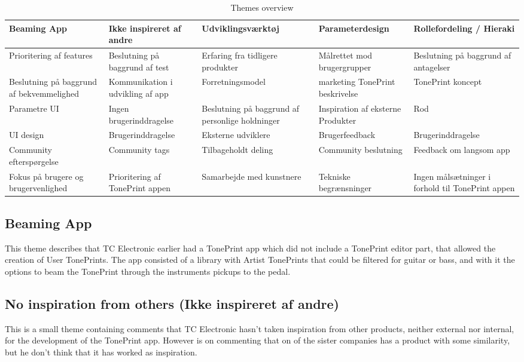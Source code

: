 \begin{table}[H]
\label{ThemesOverview}
\small
\begin{tabularx}{\textwidth}{|R|R|R|R|R|}
\hline
Beaming App & Ikke inspireret af andre & Udviklingsværktøj & Parameterdesign & Rollefordeling / Hieraki \\ \hline
Prioritering af features & Beslutning på baggrund af test & Erfaring fra tidligere produkter & Målrettet mod brugergrupper & Beslutning på baggrund af antagelser \\ \hline
Beslutning på baggrund af bekvemmelighed & Kommunikation i udvikling af app & Forretningsmodel & marketing \/ TonePrint beskrivelse & TonePrint koncept \\ \hline
 Parametre UI & Ingen brugerinddragelse & Beslutning på baggrund af personlige holdninger & Inspiration af eksterne Produkter & Rod \\ \hline
UI design & Brugerinddragelse & Eksterne udviklere & Brugerfeedback & Brugerinddragelse \\ \hline
Community efterspørgelse & Community tags & Tilbageholdt deling & Community beslutning & Feedback om langsom app \\ \hline
Fokus på brugere og brugervenlighed & Prioritering af TonePrint appen & Samarbejde med kunstnere & Tekniske begrænsninger & Ingen målsætninger i forhold til TonePrint appen \\ \hline
\end{tabularx}
\caption{Themes overview}
\end{table}


\subsection*{Beaming App}
\label{ThemeBeamingApp}
This theme describes that TC Electronic earlier had a TonePrint app which did not include a TonePrint editor part, that allowed the creation of User TonePrints. The app consisted of a library with Artist TonePrints that could be filtered for guitar or bass, and with it the options to beam the TonePrint through the instruments pickups to the pedal.

\subsection*{No inspiration from others (Ikke inspireret af andre)}
\label{ThemeNoInspirationFromOthers}
This is a small theme containing comments that TC Electronic hasn't taken inspiration from other products, neither external nor internal, for the development of the TonePrint app. However is on commenting that on of the sister companies has a product with some similarity, but he don't think that it has worked as inspiration.


